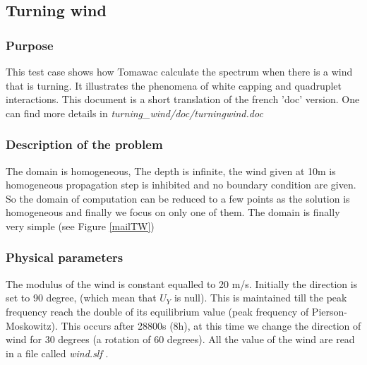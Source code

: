 \subsection{Turning wind}
%

%    
\subsubsection{Purpose}
%
This test case shows how Tomawac calculate the spectrum when there is a wind that is turning. It illustrates the phenomena of white capping and quadruplet interactions.  This document is a short translation of the french 'doc' version. One can find more details in {\it turning\_wind/doc/turningwind.doc}

%
\subsubsection{Description of the problem}
%
The domain is homogeneous, The depth is infinite, the wind given at 10m is homogeneous  propagation step is inhibited and no boundary condition are given. 
So the domain of computation can be reduced to a few points as the solution is homogeneous and finally we focus on only one of them. The domain is finally very simple (see Figure \ref{mailTW})


%
%
\subsubsection{Physical parameters}
%
The modulus of the wind is constant equalled to 20 m/s. Initially the direction is set to 90 degree, (which mean that $U_Y$ is null). This is maintained till the peak frequency reach the double of its equilibrium value (peak frequency of Pierson-Moskowitz). This occurs after 28800s (8h), at this time we change the direction of wind for 30 degrees (a rotation of 60 degrees). All the value of the wind are read in a file called {\it wind.slf   }. 
%
%
